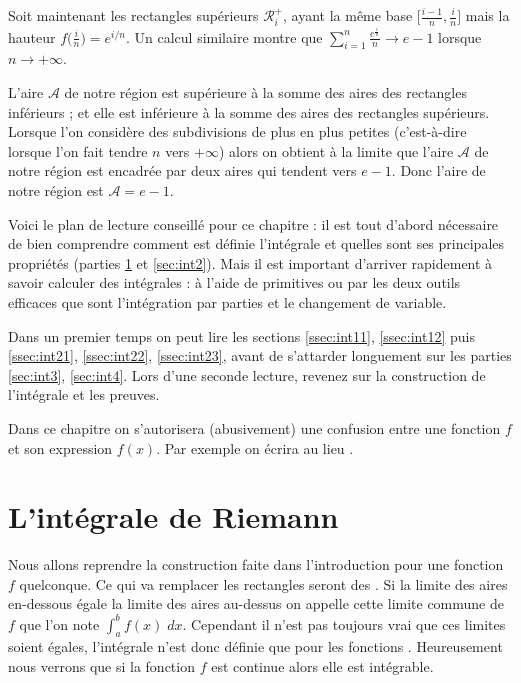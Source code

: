 \documentclass[class=report,crop=false]{standalone}
\begin{document}
Soit maintenant les \og rectangles supérieurs \fg{} $\mathcal{R}_i^+$,
ayant la même base $\big[\frac{i-1}{n},\frac{i}{n}\big]$ mais la hauteur
$f\big(\frac{i}{n}\big)=e^{i/n}$. Un calcul similaire montre que
$\sum_{i=1}^{n} \frac{e^{\frac{i}{n}}}{n} \to e-1$ lorsque $n\to +\infty$.

L'aire $\mathcal{A}$ de notre région est supérieure à la somme des aires des rectangles inférieurs  ;
et elle est inférieure
 à la somme des aires des rectangles supérieurs. Lorsque l'on considère des subdivisions de plus en plus petites
(c'est-à-dire lorsque l'on fait tendre $n$ vers $+\infty$) alors on obtient à la limite que l'aire $\mathcal{A}$
de notre région est encadrée par deux aires qui tendent vers $e-1$. Donc l'aire de notre région est
$\mathcal{A} = e-1$.



Voici le plan de lecture conseillé pour ce chapitre :
il est tout d'abord nécessaire de bien comprendre comment est définie l'intégrale
et quelles sont ses principales propriétés (parties \ref{sec:int1} et \ref{sec:int2}).
Mais il est important d'arriver rapidement à savoir calculer des intégrales :
à l'aide de primitives ou par les deux outils efficaces que sont l'intégration par parties
et le changement de variable.

Dans un premier temps on peut lire les sections \ref{ssec:int11}, \ref{ssec:int12}
puis \ref{ssec:int21}, \ref{ssec:int22}, \ref{ssec:int23},
avant de s'attarder longuement sur les parties \ref{sec:int3}, \ref{sec:int4}.
Lors d'une seconde lecture, revenez sur la construction de l'intégrale et les preuves.


Dans ce chapitre on s'autorisera (abusivement) une confusion
entre une fonction $f$ et son expression $f(x)$. Par exemple on écrira
 au lieu
.




\section{L'intégrale de Riemann}
\label{sec:int1}

Nous allons reprendre la construction faite dans l'introduction pour une fonction $f$ quelconque.
Ce qui va remplacer les rectangles seront des .
Si la limite des aires en-dessous égale la limite des aires au-dessus on appelle cette limite commune
 de $f$ que l'on note $\int_a^b f(x) \; dx$.
Cependant il n'est pas toujours vrai que ces limites soient égales, l'intégrale n'est donc
définie que pour les fonctions . Heureusement nous verrons
que si la fonction $f$ est continue alors elle est intégrable.
\end{document}
